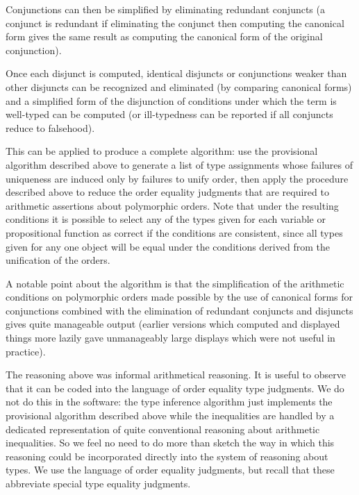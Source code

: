 \documentclass{article}
\begin{document}
Conjunctions can then be simplified by eliminating redundant conjuncts
(a conjunct is redundant if eliminating the conjunct then computing
the canonical form gives the same result as computing the canonical
form of the original conjunction).

Once each disjunct is computed, identical disjuncts or conjunctions
weaker than other disjuncts can be recognized and eliminated (by comparing
canonical forms) and a simplified form of the disjunction of
conditions under which the term is well-typed can be computed (or
ill-typedness can be reported if all conjuncts reduce to falsehood).

This can be applied to produce a complete algorithm: use the
provisional algorithm described above to generate a list of type
assignments whose failures of uniqueness are induced only by failures
to unify order, then apply the procedure described above to reduce the
order equality judgments that are required to arithmetic assertions
about polymorphic orders.  Note that under the resulting conditions it
is possible to select any of the types given for each variable or
propositional function as correct if the conditions are consistent,
since all types given for any one object will be equal under the
conditions derived from the unification of the orders.

A notable point about the algorithm is that the simplification of the
arithmetic conditions on polymorphic orders made possible by the use
of canonical forms for conjunctions combined with the elimination of
redundant conjuncts and disjuncts gives quite manageable output
(earlier versions which computed and displayed things more lazily gave
unmanageably large displays which were not useful in practice).

The reasoning above was informal arithmetical reasoning.  It is useful
to observe that it can be coded into the language of order equality
type judgments.  We do not do this in the software: the type inference
algorithm just implements the provisional algorithm described above
while the inequalities are handled by a dedicated representation of
quite conventional reasoning about arithmetic inequalities.  So we
feel no need to do more than sketch the way in which this reasoning
could be incorporated directly into the system of reasoning about
types.  We use the language of order equality judgments, but recall
that these abbreviate special type equality judgments.
\end{document}
